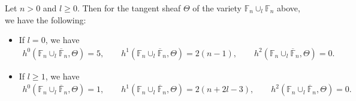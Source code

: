 \begin{Proposition}\label{prop:fd2}
Let $n>0$ and $l\ge 0$.
Then for the tangent sheaf $\Theta$ of the variety $\mathbb{F}_n \cup_l \mathbb{F}_n$ above, we have the following:
\begin{itemize}\itemsep=0pt
\item[$(i)$] If $l=0$, we have
\begin{gather*}
h^0(\mathbb{F}_n \cup_l \overline{\mathbb{F}}_n,\Theta) = 5,
\qquad
h^1(\mathbb{F}_n \cup_l \overline{\mathbb{F}}_n,\Theta) = 2(n-1),
\qquad
h^2(\mathbb{F}_n \cup_l \overline{\mathbb{F}}_n,\Theta) = 0.
\end{gather*}
\item[$(ii)$] If $l\ge 1$, we have
\begin{gather*}
h^0(\mathbb{F}_n \cup_l \overline{\mathbb{F}}_n,\Theta) = 1,
\qquad
h^1(\mathbb{F}_n \cup_l \overline{\mathbb{F}}_n,\Theta) = 2(n+2l-3),
\qquad
h^2(\mathbb{F}_n \cup_l \overline{\mathbb{F}}_n,\Theta) = 0.
\end{gather*}
\end{itemize}
\end{Proposition}


